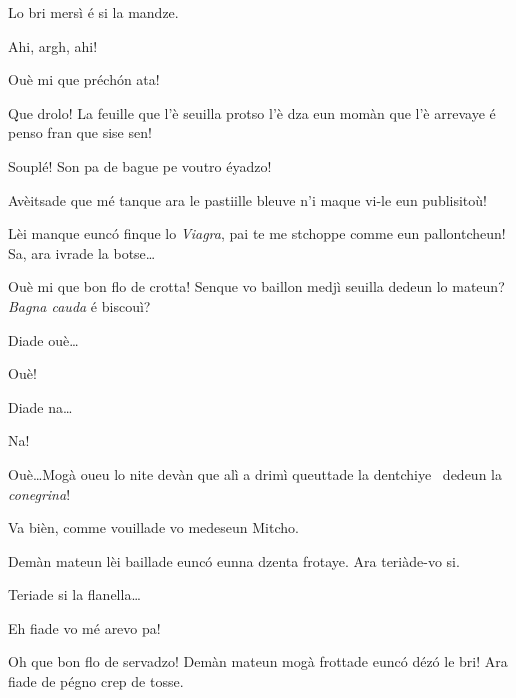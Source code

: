 \begin{drama}
\MedMitchospeaks Lo bri mersì é si la mandze.


\Casimirspeaks{} Ahi, argh, ahi!

\MedMitchospeaks Ouè mi que préch\'on ata! 

\Casimirspeaks Que drolo! La feuille que l’è seuilla protso l’è dza eun mo\-màn que l’è arrevaye é penso fran que sise sen!

\MedMitchospeaks Souplé! Son pa de bague pe voutro éyadzo!

\Casimirspeaks Avèitsade que mé tanque ara le pastiille bleuve n’i maque vi-le eun publisitoù!

\MedMitchospeaks Lèi manque eunc\'o finque lo \textit{Viagra}, pai te me stchop\-pe comme eun pallontcheun! Sa, ara ivrade la botse\ldots


\MedMitchospeaks Ouè mi que bon flo de crotta! Senque vo baillon medjì seuilla dedeun lo mateun? \textit{Bagna cauda} é biscouì? 


\MedMitchospeaks Diade ouè\ldots

\Casimirspeaks{} Ouè!

\MedMitchospeaks Diade na\ldots

\Casimirspeaks{} Na!

\MedMitchospeaks Ouè\ldots Mogà oueu lo nite devàn que alì a drimì queuttade la dentchiye \dentiera\ dedeun la \textit{conegrina}!

\Casimirspeaks Va bièn, comme vouillade vo medeseun Mitcho.

\MedMitchospeaks Demàn mateun lèi baillade eunc\'o eunna dzenta frotaye. Ara teriàde-vo si.


\MedMitchospeaks Teriade si la flanella\ldots

\Casimirspeaks  Eh fiade vo mé arevo pa!

\MedMitchospeaks{} Oh que bon flo de servadzo! Demàn mateun mogà frottade eunc\'o déz\'o le bri! Ara fiade de pégno crep de tosse.


\end{drama}
